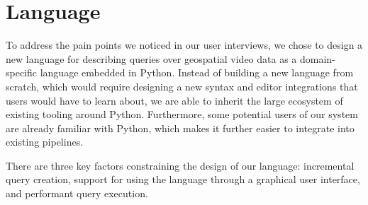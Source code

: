 
\section{Language}

To address the pain points we noticed in our user interviews, we chose to design a new language for describing queries over geospatial video data as a domain-specific language embedded in Python. Instead of building a new language from scratch, which would require designing a new syntax and editor integrations that users would have to learn about, we are able to inherit the large ecosystem of existing tooling around Python. Furthermore, some potential users of our system are already familiar with Python, which makes it further easier to integrate into existing pipelines.

There are three key factors constraining the design of our language: incremental query creation, support for using the language through a graphical user interface, and performant query execution.
